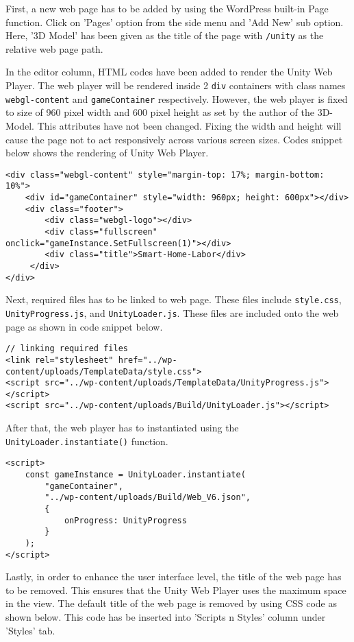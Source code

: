 First, a new web page has to be added by using the WordPress built-in Page function. Click on 'Pages' option from the side menu and 'Add New' sub option. Here, '3D Model' has been given as the title of the page with \texttt{/unity} as the relative web page path.

In the editor column, HTML codes have been added to render the Unity Web Player. The web player will be rendered inside 2 \texttt{div} containers with class names \texttt{webgl-content} and \texttt{gameContainer} respectively. However, the web player is fixed to size of 960 pixel width and 600 pixel height as set by the author of the 3D-Model. This attributes have not been changed. Fixing the width and height will cause the page not to act responsively across various screen sizes. Codes snippet below shows the rendering of Unity Web Player.

\begin{lstlisting}
<div class="webgl-content" style="margin-top: 17%; margin-bottom: 10%">
    <div id="gameContainer" style="width: 960px; height: 600px"></div>
    <div class="footer">
        <div class="webgl-logo"></div>
        <div class="fullscreen" onclick="gameInstance.SetFullscreen(1)"></div>
        <div class="title">Smart-Home-Labor</div>
     </div>
</div>
\end{lstlisting}

Next, required files has to be linked to web page. These files include \texttt{style.css}, \texttt{UnityProgress.js}, and \texttt{UnityLoader.js}. These files are included onto the web page as shown in code snippet below.

\begin{lstlisting}
// linking required files
<link rel="stylesheet" href="../wp-content/uploads/TemplateData/style.css">
<script src="../wp-content/uploads/TemplateData/UnityProgress.js"></script>  
<script src="../wp-content/uploads/Build/UnityLoader.js"></script>
\end{lstlisting}

After that, the web player has to instantiated using the \texttt{UnityLoader.instantiate()} function.

\begin{lstlisting}
<script>
	const gameInstance = UnityLoader.instantiate(
		"gameContainer",
		"../wp-content/uploads/Build/Web_V6.json",
		{
			onProgress: UnityProgress
		}
	);
</script>
\end{lstlisting}

Lastly, in order to enhance the user interface level, the title of the web page has to be removed. This ensures that the Unity Web Player uses the maximum space in the view. The default title of the web page is removed by using CSS code as shown below. This code has be inserted into 'Scripts n Styles' column under 'Styles' tab.

